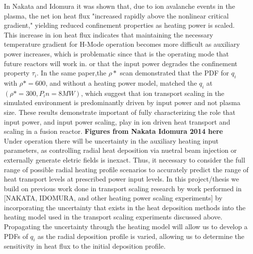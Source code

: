 \documentclass{article}
\begin{document}
In Nakata and Idomura it was shown that, due to ion avalanche events in the plasma, the net ion heat flux "increased rapidly above the nonlinear critical gradient," yielding reduced confinement properties as heating power is scaled. This increase in ion heat flux indicates that maintaining the necessary temperature gradient for H-Mode operation becomes more difficult as auxiliary power increases, which is problematic since that is the operating mode that future reactors will work in. or that the input power degrades the confinement property $\tau_i$. In the same paper,the $\rho*$ scan demonstrated that the PDF for $q_i$ with $\rho* = 600$, and without a heating power model, matched the $q_i$ at $(\rho* = 300, P_in = 8MW)$, which suggest that ion transport scaling in the simulated environment is predominantly driven by input power and not plasma size. These results demonstrate important of fully characterizing the role that input power, and input power scaling, play in ion driven heat transport and scaling in a fusion reactor. \textbf{Figures from Nakata Idomura 2014 here}\\
Under operation there will be uncertainty in the auxiliary heating input parameters, as controlling radial heat deposition via nuetral beam injection or externally generate eletric fields is inexact. Thus, it necessary to consider the full range of possible radial heating profile scenarios to accurately predict the range of heat transport levels at prescribed power input levels. In this project/thesis we build on previous work done in transport scaling research by work performed in [NAKATA, IDOMURA, and other heating power scaling experiments] by incorporating the uncertainty that exists in the heat deposition methods into the heating model used in the transport scaling experiments discussed above. Propagating the uncertainty through the heating model will allow us to develop a PDFs of $q_i$ as the radial deposition profile is varied, allowing us to determine the sensitivity in heat flux to the initial deposition profile.\\
\end{document}
